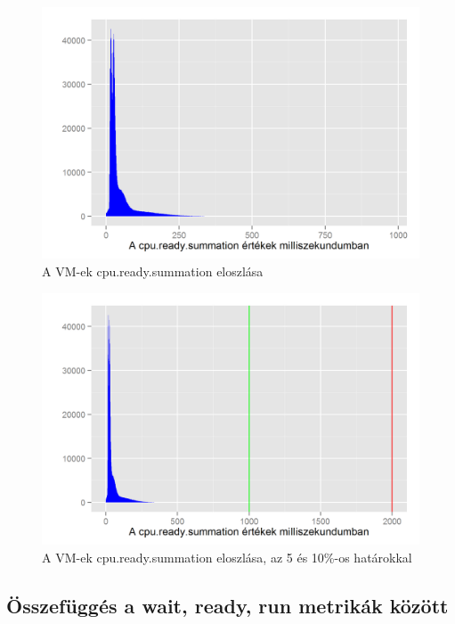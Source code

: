 \documentclass[a4paper,10pt,titlepage]{article}
\begin{document}
\begin{figure}[h!]
\centering
\includegraphics[width=1.00\textwidth]{figures/cpu_ready_summation-histogram.png}
\caption{A VM-ek cpu.ready.summation eloszlása \label{fig:cpu_ready_summation_histogram}}
\end{figure}


\begin{figure}[h!]
\centering
\includegraphics[width=1.00\textwidth]{figures/cpu_ready_summation-histogram-w-b.png}
\caption{A VM-ek cpu.ready.summation eloszlása, az 5 és 10\%-os határokkal \label{fig:cpu_ready_summation_histogram_wb}}
\end{figure}




\subsection{Összefüggés a wait, ready, run metrikák között}
\end{document}
